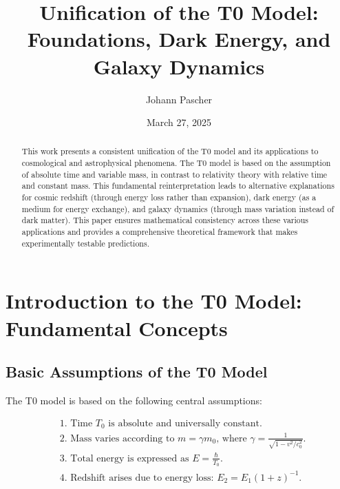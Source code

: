 \documentclass[a4paper,12pt]{article}
\theoremstyle{definition}
\theoremstyle{remark}
\begin{document}
	
	\title{Unification of the T0 Model: \\Foundations, Dark Energy, and Galaxy Dynamics}
	\author{Johann Pascher}
	\date{March 27, 2025}
	\maketitle
	
	\begin{abstract}
		This work presents a consistent unification of the T0 model and its applications to cosmological and astrophysical phenomena. The T0 model is based on the assumption of absolute time and variable mass, in contrast to relativity theory with relative time and constant mass. This fundamental reinterpretation leads to alternative explanations for cosmic redshift (through energy loss rather than expansion), dark energy (as a medium for energy exchange), and galaxy dynamics (through mass variation instead of dark matter). This paper ensures mathematical consistency across these various applications and provides a comprehensive theoretical framework that makes experimentally testable predictions.
	\end{abstract}
	
	\tableofcontents
	\newpage
	
	\section{Introduction to the T0 Model: Fundamental Concepts}
	
	\subsection{Basic Assumptions of the T0 Model}
	
	The T0 model is based on the following central assumptions:
	
	\begin{tcolorbox}[colback=blue!5!white,colframe=blue!75!black,title=Basic Assumptions of the T0 Model]
		\begin{align}
			&\text{1. Time $T_0$ is absolute and universally constant.} \\
			&\text{2. Mass varies according to $m = \gamma m_0$, where $\gamma = \frac{1}{\sqrt{1-v^2/c_0^2}}$.} \\
			&\text{3. Total energy is expressed as $E = \frac{\hbar}{T_0}$.} \\
			&\text{4. Redshift arises due to energy loss: $E_2 = E_1(1+z)^{-1}$.}
		\end{align}
	\end{tcolorbox}
	
\end{document}
